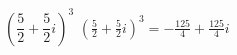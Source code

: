 { $\left(\dfrac{5}{2} + \dfrac{5}{2} i\right)^3$ }
{ $\left(\frac{5}{2} + \frac{5}{2} i\right)^3=-\frac{125}{4}+\frac{125}{4} i$ }
